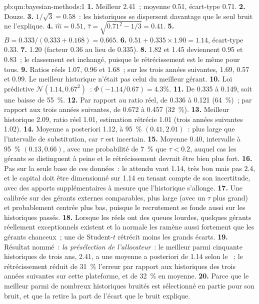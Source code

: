 \begin{solution}{pb:qm:bayesian-methods:1}
\textbf{1.} Meilleur 2.41~; moyenne 0.51, écart-type 0.71.
\textbf{2.} Douze.
\textbf{3.} $1/\sqrt3 = 0.58$~: les historiques se dispersent davantage que le seul bruit ne l'explique.
\textbf{4.} $\hat m = 0.51$, $\hat\tau = \sqrt{0.71^2 - 1/3} = 0.41$.
\textbf{5.} $B = 0.333/(0.333 + 0.168) = 0.665$.
\textbf{6.} $0.51 + 0.335 \times 1.90 = 1.14$, écart-type 0.33.
\textbf{7.} 1.20 (facteur 0.36 au lieu de 0.335).
\textbf{8.} 1.82 et 1.45 deviennent 0.95 et 0.83~; le classement est inchangé, puisque le rétrécissement est le même pour tous.
\textbf{9.} Ratios réels 1.07, 0.96 et 1.68~; sur les trois années suivantes, 1.69, 0.57 et 0.99. Le meilleur historique n'était pas celui du meilleur gérant.
\textbf{10.} Loi prédictive $\mathcal N(1.14, 0.67^2)$~: $\Phi(-1.14/0.67) = 4.3\%$.
\textbf{11.} De 0.335 à 0.149, soit une baisse de 55~\%.
\textbf{12.} Par rapport au ratio réel, de 0.336 à 0.121 (64~\%)~; par rapport aux trois années suivantes, de 0.672 à 0.457 (32~\%).
\textbf{13.} Meilleur historique 2.09, ratio réel 1.01, estimation rétrécie 1.01 (trois années suivantes 1.02).
\textbf{14.} Moyenne a posteriori 1.12,  à 95~\% $(0.41, 2.01)$~: plus large que l'intervalle de substitution, car $\tau$ est incertain.
\textbf{15.} Moyenne 0.40, intervalle à 95~\% $(0.13, 0.66)$, avec une probabilité de 7~\% que $\tau < 0.2$, auquel cas les gérants se distinguent à peine et le
rétrécissement devrait être bien plus fort.
\textbf{16.} Pas sur la seule base de ces données~: le  attendu vaut 1.14, très bon mais pas 2.4, et le capital doit être dimensionné sur 1.14
en tenant compte de son incertitude, avec des apports supplémentaires à mesure que l'historique s'allonge.
\textbf{17.} Une  calibrée sur des gérants externes comparables, plus large (avec un $\tau$ plus grand) et probablement centrée plus bas, puisque le recrutement se fonde
aussi sur les historiques passés.
\textbf{18.} Lorsque les  réels ont des queues lourdes, quelques gérants réellement exceptionnels existent et la  normale les ramène aussi fortement
que les gérants chanceux~; une  de Student-$t$ rétrécit moins les grands écarts.
\textbf{19.} Résultat nommé~: \emph{la présélection de l'allocateur}~: le meilleur parmi cinquante historiques de trois ans, 2.41, a une moyenne a posteriori
de 1.14 selon le ~; le rétrécissement réduit de 31~\% l'erreur par rapport aux historiques des trois années suivantes sur cette plateforme, et de 32~\% en moyenne.
\textbf{20.} Parce que le meilleur parmi de nombreux historiques bruités est sélectionné en partie pour son bruit, et que la  retire la part de l'écart que
le bruit explique.
\end{solution}

